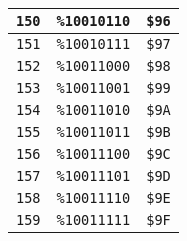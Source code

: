 \begin{multicols}{2}
\begin{center}
\begin{tabular}{|c|c|c|}
 \texttt{150} & \texttt{\%10010110} &  \texttt{\$96} \\ \hline
 \texttt{151} & \texttt{\%10010111} &  \texttt{\$97} \\ \hline
 \texttt{152} & \texttt{\%10011000} &  \texttt{\$98} \\ \hline
 \texttt{153} & \texttt{\%10011001} &  \texttt{\$99} \\ \hline
 \texttt{154} & \texttt{\%10011010} &  \texttt{\$9A} \\ \hline
 \texttt{155} & \texttt{\%10011011} &  \texttt{\$9B} \\ \hline
 \texttt{156} & \texttt{\%10011100} &  \texttt{\$9C} \\ \hline
 \texttt{157} & \texttt{\%10011101} &  \texttt{\$9D} \\ \hline
 \texttt{158} & \texttt{\%10011110} &  \texttt{\$9E} \\ \hline
 \texttt{159} & \texttt{\%10011111} &  \texttt{\$9F} \\ \hline
	\end{tabular}
\end{center}
 

\end{multicols}
